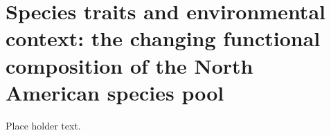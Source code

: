 \chapter{Species traits and environmental context: the changing functional composition of the North American species pool} \label{ch:coping}

Place holder text.
